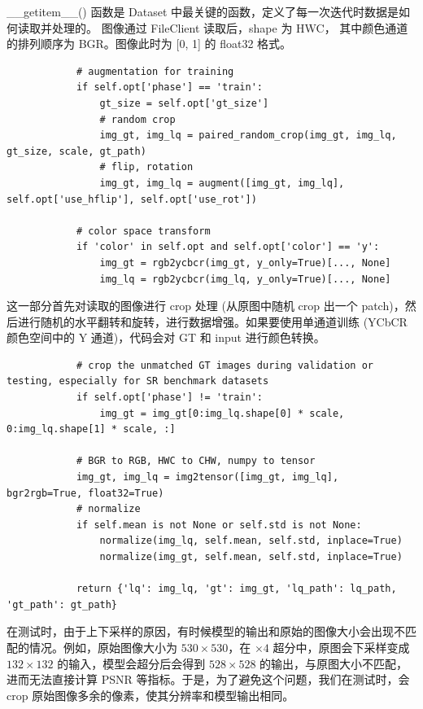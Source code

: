 \documentclass[../main.tex]{subfiles}
\begin{document}
    \_\_getitem\_\_() 函数是 Dataset 中最关键的函数，定义了每一次迭代时数据是如何读取并处理的。 图像通过 FileClient 读取后，shape 为 HWC， 其中颜色通道的排列顺序为 BGR。图像此时为 [0, 1] 的 float32 格式。

    \begin{verbatim}
            # augmentation for training
            if self.opt['phase'] == 'train':
                gt_size = self.opt['gt_size']
                # random crop
                img_gt, img_lq = paired_random_crop(img_gt, img_lq, gt_size, scale, gt_path)
                # flip, rotation
                img_gt, img_lq = augment([img_gt, img_lq], self.opt['use_hflip'], self.opt['use_rot'])

            # color space transform
            if 'color' in self.opt and self.opt['color'] == 'y':
                img_gt = rgb2ycbcr(img_gt, y_only=True)[..., None]
                img_lq = rgb2ycbcr(img_lq, y_only=True)[..., None]
    \end{verbatim}

    这一部分首先对读取的图像进行 crop 处理 (从原图中随机 crop 出一个 patch)，然后进行随机的水平翻转和旋转，进行数据增强。如果要使用单通道训练 (YCbCR 颜色空间中的 Y 通道)，代码会对 GT 和 input 进行颜色转换。

    \begin{verbatim}
            # crop the unmatched GT images during validation or testing, especially for SR benchmark datasets
            if self.opt['phase'] != 'train':
                img_gt = img_gt[0:img_lq.shape[0] * scale, 0:img_lq.shape[1] * scale, :]

            # BGR to RGB, HWC to CHW, numpy to tensor
            img_gt, img_lq = img2tensor([img_gt, img_lq], bgr2rgb=True, float32=True)
            # normalize
            if self.mean is not None or self.std is not None:
                normalize(img_lq, self.mean, self.std, inplace=True)
                normalize(img_gt, self.mean, self.std, inplace=True)

            return {'lq': img_lq, 'gt': img_gt, 'lq_path': lq_path, 'gt_path': gt_path}
    \end{verbatim}

    在测试时，由于上下采样的原因，有时候模型的输出和原始的图像大小会出现不匹配的情况。例如，原始图像大小为 $530 \times 530$，在 $\times 4$  超分中，原图会下采样变成 $132 \times 132$ 的输入，模型会超分后会得到 $528 \times 528$ 的输出，与原图大小不匹配，进而无法直接计算 PSNR 等指标。于是，为了避免这个问题，我们在测试时，会 crop 原始图像多余的像素，使其分辨率和模型输出相同。
\end{document}
